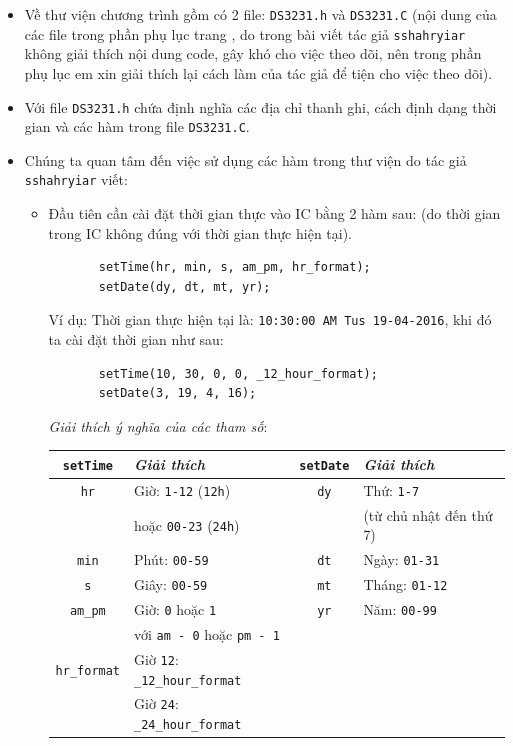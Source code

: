\begin{itemize}
\begin{itemize}
\item Về thư viện chương trình gồm có 2 file: \verb|DS3231.h| và \verb|DS3231.C| (nội dung của các file trong phần phụ lục trang \pageref{def:DS3231}, do trong bài viết tác giả \verb|sshahryiar| không giải thích nội dung code, gây khó cho việc theo dõi, nên trong phần phụ lục em xin giải thích lại cách làm của tác giả để tiện cho việc theo dõi).
\item Với file \verb|DS3231.h| chứa định nghĩa các địa chỉ thanh ghi, cách định dạng thời gian và các hàm trong file \verb|DS3231.C|.
\item Chúng ta quan tâm đến việc sử dụng các hàm trong thư viện do tác giả \verb|sshahryiar| viết:
\begin{itemize}
\item Đầu tiên cần cài đặt thời gian thực vào IC bằng 2 hàm sau: (do thời gian trong IC không đúng với thời gian thực hiện tại).
\begin{verbatim}
       setTime(hr, min, s, am_pm, hr_format);
       setDate(dy, dt, mt, yr);
\end{verbatim}
Ví dụ: Thời gian thực hiện tại là: \verb|10:30:00 AM Tus 19-04-2016|, khi đó ta cài đặt thời gian như sau:
\begin{verbatim}
       setTime(10, 30, 0, 0, _12_hour_format);
       setDate(3, 19, 4, 16);
\end{verbatim}
\textit{Giải thích ý nghĩa của các tham số}:
\begin{table}[!h]
\begin{center}
\begin{tabular}{|c|l|c|l|}\hline
\verb|setTime| & \textit{Giải thích} & \verb|setDate| & \textit{Giải thích} \\ \hline
\verb|hr| & Giờ: \verb|1-12| (\verb|12h|) & \verb|dy| & Thứ: \verb|1-7| \\ 
& hoặc \verb|00-23| (\verb|24h|) & & (từ chủ nhật đến thứ 7) \\ \hline
\verb|min| & Phút: \verb|00-59| & \verb|dt| & Ngày: \verb|01-31|\\ \hline
\verb|s| & Giây: \verb|00-59| & \verb|mt| & Tháng: \verb|01-12|\\ \hline
\verb|am_pm| & Giờ: \verb|0| hoặc \verb|1|  & \verb|yr| & Năm: \verb|00-99|\\ 
& với \verb|am - 0| hoặc \verb|pm - 1| & & \\ \hline
\verb|hr_format| & Giờ \verb|12|: \verb|_12_hour_format| & & \\
 & Giờ \verb|24|: \verb|_24_hour_format| & & \\ \hline

\end{tabular}
\end{center}
\end{table}
\end{itemize}
\end{itemize}
\end{itemize}
